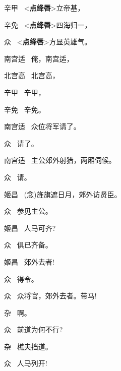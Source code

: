 {辛甲\hspace{30pt}~  \textless{}{\bfseries\akai 点绛唇}\textgreater{}立帝基，

辛免\hspace{30pt}~  \textless{}{\bfseries\akai 点绛唇}\textgreater{}四海归一，

众\hspace{41pt}~  \textless{}{\bfseries\akai 点绛唇}\textgreater{}方显英雄气。

南宫适\hspace{20pt}~ 俺，南宫适，

北宫高\hspace{20pt}~ 北宫高，

辛甲\hspace{30pt}~ 辛甲，

辛免\hspace{30pt}~ 辛免。

南宫适\hspace{20pt}~ 众位将军请了。

众\hspace{41pt}~ 请了。

南宫适\hspace{20pt}~ 主公郊外射猎，两厢伺候。

众\hspace{41pt}~ 请。

姬昌\hspace{30pt}~ ({\akai 念})旌旗遮日月，郊外访贤臣。

众\hspace{41pt}~ 参见主公。

姬昌\hspace{30pt}~ 人马可齐?

众\hspace{41pt}~ 俱已齐备。

姬昌\hspace{30pt}~ 郊外去者!

众\hspace{41pt}~ 得令。

众\hspace{41pt}~ 众将官，郊外去者。带马!

杂\hspace{41pt}~ 啊。

众\hspace{41pt}~ 前道为何不行?

杂\hspace{41pt}~ 樵夫挡道。

众\hspace{41pt}~ 人马列开!

}
